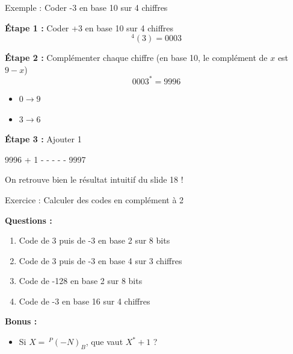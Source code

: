 \documentclass[aspectratio=1610]{beamer}
\begin{document}
\begin{frame}[fragile]{Exemple : Coder -3 en base 10 sur 4 chiffres}

  \textbf{Étape 1 :} Coder +3 en base 10 sur 4 chiffres
  \[
    ^4(3) = 0003
  \]

  \textbf{Étape 2 :} Complémenter chaque chiffre (en base 10, le complément de $x$ est $9-x$)
  \[
    0003^* = 9996
  \]
  \begin{itemize}
    \item $0 \rightarrow 9$
    \item $3 \rightarrow 6$
  \end{itemize}

  \textbf{Étape 3 :} Ajouter 1
  \begin{semiverbatim}
      9996
    +    1
    - - - - - 
      9997
  \end{semiverbatim}



  On retrouve bien le résultat intuitif du slide 18 !

\end{frame}


\begin{frame}{Exercice : Calculer des codes en complément à 2}

  \textbf{Questions :}

  \begin{enumerate}
    \item[a)] Code de 3 puis de -3 en base 2 sur 8 bits
    \item[b)] Code de 3 puis de -3 en base 4 sur 3 chiffres
    \item[c)] Code de -128 en base 2 sur 8 bits
    \item[d)] Code de -3 en base 16 sur 4 chiffres
  \end{enumerate}

  \vspace{1em}

  \textbf{Bonus :}
  \begin{itemize}
    \item[e)] Si $X = \,^P(-N)_B$, que vaut $X^* + 1$ ?
  \end{itemize}

\end{frame}
\end{document}
